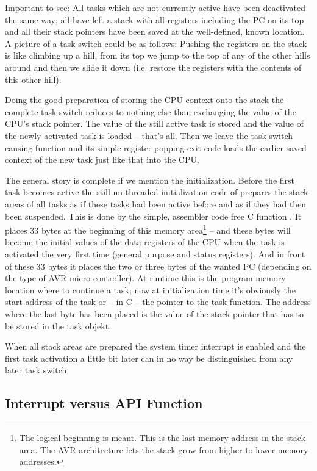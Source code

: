 Important to see: All tasks which are not currently active have been
deactivated the same way; all have left a stack with all registers
including the PC on its top and all their stack pointers have been saved
at the well-defined, known location. A picture of a task switch could be
as follows: Pushing the registers on the stack is like climbing up a hill,
from its top we jump to the top of any of the other hills around and then
we slide it down (i.e. restore the registers with the contents of this
other hill).

Doing the good preparation of storing the CPU context onto the stack the
complete task switch reduces to nothing else than exchanging the value of
the CPU's stack pointer. The value of the still active task is stored and
the value of the newly activated task is loaded -- that's all. Then we
leave the task switch causing function and its simple register popping
exit code loads the earlier saved context of the new task just like that
into the CPU.

The general story is complete if we mention the initialization. Before the
first task becomes active the still un-threaded initialization code of
\rtos{} prepares the stack areas of all tasks as if these tasks had been
active before and as if they had then been suspended. This is done by the
simple, assembler code free C function . It places
33 bytes at the beginning of this memory area\footnote{The logical
beginning is meant. This is the last memory address in the stack area. The
AVR architecture lets the stack grow from higher to lower memory
addresses.} -- and these bytes will become the initial values of the data
registers of the CPU when the task is activated the very first time
(general purpose and status registers). And in front of these 33 bytes it
places the two or three bytes of the wanted PC (depending on the type of
AVR micro controller). At runtime this is the program memory location where to continue
a task; now at initialization time it's obviously the start address of the
task or -- in C -- the pointer to the task function. The address where the
last byte has been placed is the value of the stack pointer that has to be
stored in the task objekt.

When all stack areas are prepared the system timer interrupt is enabled
and the first task activation a little bit later can in no way be
distinguished from any later task switch.


\subsection{Interrupt versus API Function}
\label{secISRVsAPIFunc}

